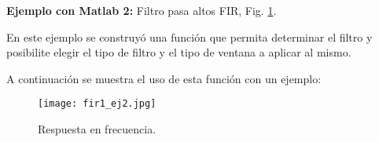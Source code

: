 \documentclass[informe.tex]{subfiles}
\begin{document}
\textbf{Ejemplo con Matlab 2:} Filtro pasa altos FIR, Fig. \ref{fig:fir:freqz_ej2}.\newline    

En este ejemplo se construyó una función que permita determinar el filtro y posibilite elegir el tipo de filtro y el tipo de ventana a aplicar al mismo.



A continuación se muestra el uso de esta función con un ejemplo:


	
	\begin{figure}[h]
		\centering
		\texttt{[image: fir1\_ej2.jpg]}
		\caption{Respuesta en frecuencia.}
		\label{fig:fir:freqz_ej2}
	\end{figure}
	
\end{document}
